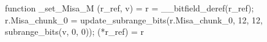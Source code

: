 function _set_Misa_M (r_ref, v) = {
    r = __bitfield_deref(r_ref);
    r.Misa_chunk_0 = update_subrange_bits(r.Misa_chunk_0, 12, 12, subrange_bits(v, 0, 0));
    (*r_ref) = r
}
